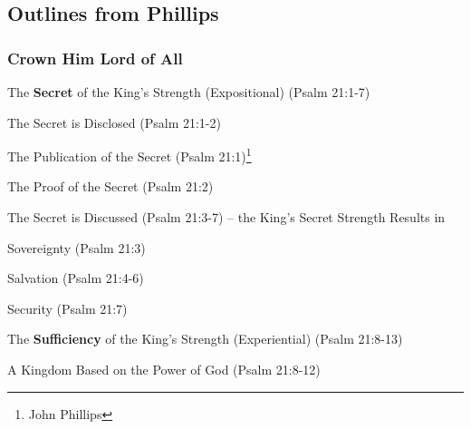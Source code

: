 \subsection{Outlines from Phillips}

\subsubsection{Crown Him Lord of All}


\begin{compactenum}[I.][7]
    \item The  \textbf{Secret} of the King's Strength (Expositional) (Psalm 21:1-7)
    \begin{compactenum}[A.][2]
        \item The Secret is Disclosed (Psalm 21:1-2)
        \begin{compactenum}[1.]
            \item The Publication of the Secret (Psalm 21:1)\footnote{John Phillips}
            \item The Proof of the Secret (Psalm 21:2)
        \end{compactenum}
        \item The Secret is Discussed (Psalm 21:3-7) -- the King's Secret Strength Results in
        \begin{compactenum}[1.]
            \item Sovereignty (Psalm 21:3)
            \item Salvation (Psalm 21:4-6)
            \item Security (Psalm 21:7)
        \end{compactenum}
    \end{compactenum}
    \item The  \textbf{Sufficiency} of the King's Strength (Experiential) (Psalm 21:8-13)
    \begin{compactenum}[A.][2]
        \item A Kingdom Based on the Power of God (Psalm 21:8-12)

\end{compactenum}
\end{compactenum}
